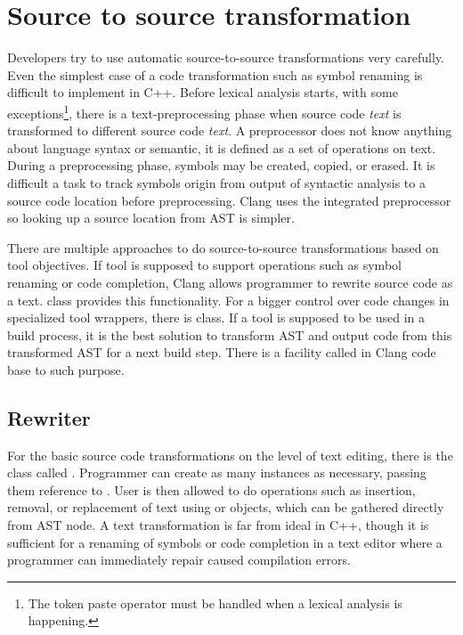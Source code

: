 \section{Source to source transformation}
Developers try to use automatic source-to-source transformations very carefully. Even the simplest case of a code transformation such as symbol renaming is difficult to implement in C++. Before lexical analysis starts, with some exceptions\footnote{The token paste operator \code{\#\#} must be handled when a lexical analysis is happening.}, there is a text-preprocessing phase when source code \emph{text} is transformed to different source code \emph{text}. A preprocessor does not know anything about language syntax or semantic, it is defined as a set of operations on text. During a preprocessing phase, symbols may be created, copied, or erased. It is difficult a task to track symbols origin from output of syntactic analysis to a source code location before preprocessing. Clang uses the integrated preprocessor so looking up a source location from AST is simpler.

There are multiple approaches to do source-to-source transformations based on tool objectives. If tool is supposed to support operations such as symbol renaming or code completion, Clang allows programmer to rewrite source code as a text.  class provides this functionality. For a bigger control over code changes in specialized tool wrappers, there is  class. If a tool is supposed to be used in a build process, it is the best solution to transform AST and output code from this transformed AST for a next build step. There is a facility called  in Clang code base to such purpose.

\subsection{Rewriter}
For the basic source code transformations on the level of text editing, there is the class called . Programmer can create as many instances as necessary, passing them reference to .  User is then allowed to do operations such as insertion, removal, or replacement of text using  or  objects, which can be gathered directly from AST node. A text transformation is far from ideal in C++, though it is sufficient for a renaming of symbols or code completion in a text editor where a programmer can immediately repair caused compilation errors.


